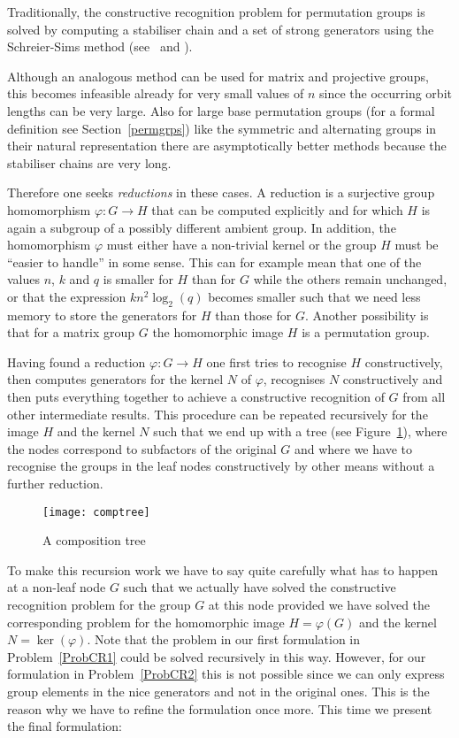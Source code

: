 Traditionally, the constructive recognition problem for permutation
groups is solved by computing a stabiliser chain and a set of strong
generators using the Schreier-Sims method (see~\cite{Si} and \cite{Ser}). 

Although an analogous method can be used for matrix and projective groups,
this becomes infeasible already for very small values of $n$ since the
occurring orbit lengths can be very large. Also for large base permutation
groups (for a formal definition see Section~\ref{permgrps}) like the
symmetric and alternating groups in their natural representation there
are asymptotically better methods because the stabiliser chains are very long.

Therefore one seeks \emph{reductions} in these cases. A reduction is
a surjective group homomorphism $\varphi : G \to H$ that can be computed
explicitly and for which $H$ is again a subgroup of a possibly different
ambient group. In addition, the homomorphism $\varphi$ must either have
a non-trivial kernel or the group $H$ must be ``easier to handle'' in some
sense. This can for example mean that one of the values $n$, $k$ and
$q$ is smaller for $H$ than for $G$ while the others remain unchanged,
or that the expression $kn^2\log_2(q)$ becomes smaller such that we need
less memory to store the generators for $H$ than those for $G$.
Another possibility is that for a matrix group $G$ the homomorphic image
$H$ is a permutation group.

Having found a reduction $\varphi : G \to H$ one first tries to recognise
$H$ constructively, then computes generators for the kernel $N$ of
$\varphi$, recognises $N$ constructively and then puts everything together
to achieve a constructive recognition of $G$ from all other intermediate
results. This procedure can be repeated recursively for the image $H$ and
the kernel $N$ such that we end up with a tree (see
Figure~\ref{comptreefig}), where the nodes correspond
to subfactors of the original $G$ and where we have to recognise
the groups in the leaf nodes constructively by other means without
a further reduction.

\begin{figure}
\begin{center}
\texttt{[image: comptree]}
\end{center}
\caption{A composition tree}
\label{comptreefig}
\end{figure}

To make this recursion work we have to say quite carefully what has to
happen at a non-leaf node $G$ such that we actually have solved the
constructive recognition problem for the group $G$ at this node provided
we have solved the corresponding problem for the homomorphic image
$H=\varphi(G)$ and the kernel $N = \ker(\varphi)$. Note that the problem
in our first formulation in Problem~\ref{ProbCR1} could be solved
recursively in this way. However, for our formulation in Problem~\ref{ProbCR2}
this is not possible since we can only express group elements in the nice
generators and not in the original ones. This is the reason why we have to
refine the formulation once more. This time we present the final
formulation:


